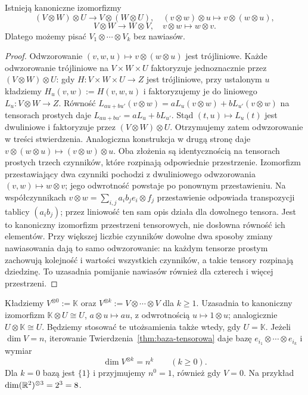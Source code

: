 \begin{stwierdzenie}
\label{prop:tensor-lacznosc}
Istnieją kanoniczne izomorfizmy
\[
 (V\otimes W)\otimes U\longrightarrow V\otimes(W\otimes U),
 \quad (v\otimes w)\otimes u\longmapsto v\otimes(w\otimes u),
\]
\[
 V\otimes W\longrightarrow W\otimes V,
 \quad v\otimes w\longmapsto w\otimes v.
\]
Dlatego możemy pisać $V_1\otimes\cdots\otimes V_k$ bez nawiasów.
\end{stwierdzenie}
\begin{proof}
Odwzorowanie $(v,w,u)\mapsto v\otimes(w\otimes u)$ jest
trójliniowe. Każde odwzorowanie trójliniowe na $V\times W\times U$
faktoryzuje jednoznacznie przez $(V\otimes W)\otimes U$:
gdy $H\colon V\times W\times U\to Z$ jest trójliniowe,
przy ustalonym $u$ kładziemy $H_u(v,w):=H(v,w,u)$
i faktoryzujemy je do liniowego $L_u\colon V\otimes W\to Z$.
Równość
$L_{au+bu'}(v\otimes w)=aL_u(v\otimes w)+bL_{u'}(v\otimes w)$
na tensorach prostych daje $L_{au+bu'}=aL_u+bL_{u'}$.
Stąd $(t,u)\mapsto L_u(t)$ jest dwuliniowe i faktoryzuje
przez $(V\otimes W)\otimes U$. Otrzymujemy zatem odwzorowanie w treści
stwierdzenia. Analogiczna konstrukcja w drugą stronę daje
$v\otimes(w\otimes u)\mapsto(v\otimes w)\otimes u$.
Oba złożenia są identycznością na tensorach prostych trzech
czynników, które rozpinają odpowiednie przestrzenie.
Izomorfizm przestawiający dwa czynniki pochodzi z dwuliniowego
odwzorowania $(v,w)\mapsto w\otimes v$; jego odwrotność powstaje
po ponownym przestawieniu.
Na współczynnikach $v\otimes w=\sum_{i,j}a_i b_j e_i\otimes f_j$
przestawienie odpowiada transpozycji tablicy $(a_i b_j)$;
przez liniowość ten sam opis działa dla dowolnego tensora.
Jest to kanoniczny izomorfizm przestrzeni tensorowych,
nie dosłowna równość ich elementów.
Przy większej liczbie czynników dowolne dwa sposoby zmiany
nawiasowania dają to samo odwzorowanie: na każdym tensorze
prostym zachowują kolejność i wartości wszystkich czynników,
a takie tensory rozpinają dziedzinę. To uzasadnia pomijanie
nawiasów również dla czterech i więcej przestrzeni.
\end{proof}

Kładziemy $V^{\otimes0}:=\mathbb K$ oraz
$V^{\otimes k}:=V\otimes\cdots\otimes V$ dla $k\geq1$.
Uzasadnia to kanoniczny izomorfizm
$\mathbb K\otimes U\cong U$, $a\otimes u\mapsto au$,
z odwrotnością $u\mapsto1\otimes u$; analogicznie
$U\otimes\mathbb K\cong U$. Będziemy stosować te
utożsamienia także wtedy, gdy $U=\mathbb K$.
Jeżeli $\dim V=n$, iterowanie Twierdzenia~\ref{thm:baza-tensorowa}
daje bazę $e_{i_1}\otimes\cdots\otimes e_{i_k}$ i wymiar
\begin{equation}\label{eq:dim-potega-tensorowa}
 \dim V^{\otimes k}=n^k\qquad(k\geq0).
\end{equation}
Dla $k=0$ bazą jest $\{1\}$ i przyjmujemy $n^0=1$,
również gdy $V=0$. Na przykład
$\dim(\mathbb{R}^2)^{\otimes3}=2^3=8$.

